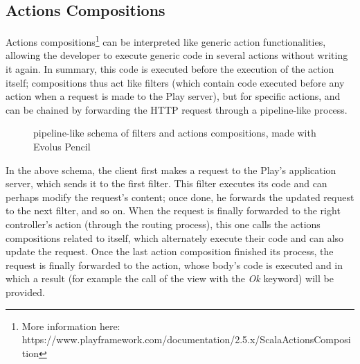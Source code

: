 \documentclass[a4paper,11pt]{report}
\begin{document}
\subsection{Actions Compositions}
\label{actionsCompositions}
Actions compositions\footnote{More information here: https://www.playframework.com/documentation/2.5.x/ScalaActionsComposition} can be interpreted like generic action functionalities, allowing the developer to execute generic code in several actions without writing it again. In summary, this code is executed before the execution of the action itself; compositions thus act like filters (which contain code executed before any action when a request is made to the Play server), but for specific actions, and can be chained by forwarding the HTTP request through a pipeline-like process.
\begin{figure}[H]
\vspace{-5pt}
\begin{center}
\vspace{-5pt}
\caption{pipeline-like schema of filters and actions compositions, made with Evolus Pencil}
\end{center}
\end{figure}
\vspace{-10pt}
In the above schema, the client first makes a request to the Play's application server, which sends it to the first filter. This filter executes its code and can perhaps modify the request's content; once done, he forwards the updated request to the next filter, and so on. When the request is finally forwarded to the right controller's action (through the routing process), this one calls the actions compositions related to itself, which alternately execute their code and can also update the request. Once the last action composition finished its process, the request is finally forwarded to the action, whose body's code is executed and in which a result (for example the call of the view with the \emph{Ok} keyword) will be provided.
\end{document}
